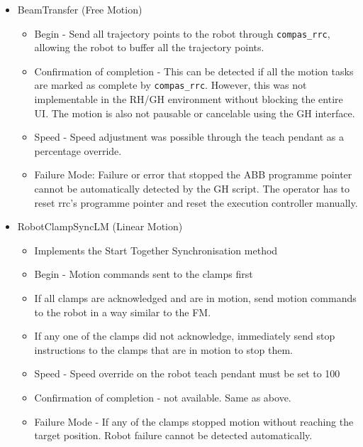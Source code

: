 \begin{itemize}
\item BeamTransfer (Free Motion)
    \begin{itemize}
        \item Begin - Send all trajectory points to the robot through \verb|compas_rrc|, allowing the robot to buffer all the trajectory points. 
        \item Confirmation of completion  -  This can be detected if all the motion tasks are marked as complete by \verb|compas_rrc|. However, this was not implementable in the RH/GH environment without blocking the entire UI. The motion is also not pausable or cancelable using the GH interface.
        \item Speed - Speed adjustment was possible through the teach pendant as a percentage override.
        \item Failure Mode: Failure or error that stopped the ABB programme pointer cannot be automatically detected by the GH script. The operator has to reset rrc’s programme pointer and reset the execution controller manually.
    \end{itemize}
    \item RobotClampSyncLM (Linear Motion)
    \begin{itemize}
        \item Implements the Start Together Synchronisation method 
        \item Begin - Motion commands sent to the clamps first
    \end{itemize}
    \begin{itemize}
        \item If all clamps are acknowledged and are in motion, send motion commands to the robot in a way similar to the FM.
        \item If any one of the clamps did not acknowledge, immediately send stop instructions to the clamps that are in motion to stop them. 
    \end{itemize}
    \begin{itemize}
        \item Speed - Speed override on the robot teach pendant must be set to 100%
        \item Confirmation of completion - not available. Same as above.
        \item Failure Mode - If any of the clamps stopped motion without reaching the target position. Robot failure cannot be detected automatically.
    \end{itemize}
\end{itemize}

